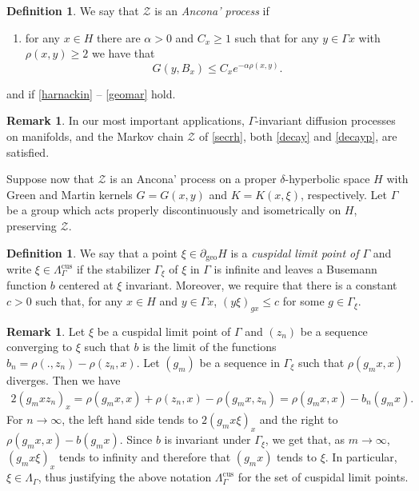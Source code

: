 \documentclass[12pt,a4paper]{amsart}
\newcounter{alph}
\numberwithin{equation}{section}
\theoremstyle{definition}
\newtheorem{dfn}[equation]{Definition}
\newtheorem{rem}[equation]{Remark}
\DeclareMathOperator{\cus}{cus}
\DeclareMathOperator{\geo}{geo}
\begin{document}
\begin{dfn}\label{Procp}
We say that $\mathcal{Z}$ is an \emph{Ancona' process} if
\begin{enumerate}[leftmargin=*, label=(A\arabic*')]
\item\label{decayp}
for any $x \in H$ there are $\alpha>0$ and $C_x\ge 1$ such that for any $y \in \Gamma x$ with $\rho(x,y) \geq 2$ we have that
\begin{equation*}
    G(y,B_{x}) \le C_x e^{-\alpha \rho(x,y)}.
\end{equation*}
\end{enumerate}
\end{dfn}
\noindent
and if \ref{harnackin} -- \ref{geomar} hold.

\begin{rem}\label{ancp}
In our most important applications, $\Gamma$-invariant diffusion processes on manifolds, and the Markov chain $\mathcal Z$ of \cref{secrh}, both \ref{decay} and \ref{decayp}, are satisfied.
\end{rem}

Suppose now that $\mathcal Z$ is an Ancona' process on a proper $\delta$-hyperbolic space $H$ with Green and Martin kernels $G=G(x,y)$ and $K=K(x,\xi)$, respectively.
Let $\Gamma$ be a group which acts properly discontinuously and isometrically on $H$, preserving $\mathcal{Z}$.

\begin{dfn}\label{cococ}
We say that a point $\xi\in\partial_{\geo}H$ is a \emph{cuspidal limit point of $\Gamma$} and write $\xi\in\Lambda_\Gamma^{\cus}$ if the stabilizer $\Gamma_\xi$ of $\xi$ in $\Gamma$ is infinite and leaves a Busemann function $b$ centered at $\xi$ invariant.
Moreover, we require that there is a constant $c>0$ such that, for any $x\in H$ and $y\in\Gamma x$, $(y\xi)_{gx}\le c$ for some $g\in\Gamma_\xi$.
\end{dfn}

\begin{rem}
Let $\xi$ be a cuspidal limit point of $\Gamma$ and $(z_n)$ be a sequence converging to $\xi$ such that $b$ is the limit of the functions $b_n=\rho(.,z_n)-\rho(z_n,x)$.
Let $(g_m)$ be a sequence in $\Gamma_\xi$ such that $\rho(g_mx,x)$ diverges.
Then we have
\begin{align*}
    2(g_mx z_n)_x = \rho(g_mx,x) + \rho(z_n,x) - \rho(g_mx,z_n) =  \rho(g_mx,x) - b_n(g_mx).
\end{align*}
For $n\to\infty$, the left hand side tends to $2(g_mx\xi)_x$ and the right to $\rho(g_mx,x)-b(g_mx)$.
Since $b$ is invariant under $\Gamma_\xi$, we get that, as $m\to\infty$, $(g_mx\xi)_x$ tends to infinity and therefore that $(g_mx)$ tends to $\xi$.
In particular, $\xi\in\Lambda_\Gamma$, thus justifying the above notation $\Lambda_\Gamma^{\cus}$ for the set of cuspidal limit points.
\end{rem}
\end{document}
